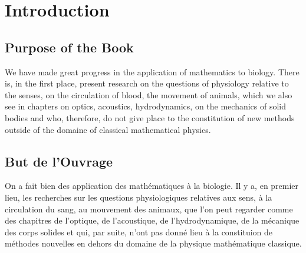 \documentclass[crop=false,class=book,oneside]{standalone}
\begin{document}
    \chapter{Introduction}
    \begin{paracol}{2}
    \section{Purpose of the Book}
    We have made great progress in the application of mathematics to biology. There is, in the first place, present research on the questions of physiology relative to the senses, on the circulation of blood, the movement of animals, which we also see in chapters on optics, acoustics, hydrodynamics, on the mechanics of solid bodies and who, therefore, do not give place to the constitution of new methods outside of the domaine of classical mathematical physics.
    \switchcolumn
    \section*{But de l'Ouvrage}
    \begin{sloppypar}
    On a fait bien des application des math\'{e}matiques \`{a} la biologie. Il y a, en premier lieu, les recherches sur les questions physiologiques relatives aux sens, \`{a} la circulation du sang, au mouvement des animaux, que l'on peut regarder comme des chapitres de l'optique, de l'acoustique, de l'hydrodynamique, de la m\'{e}canique des corps solides et qui, par suite, n'ont pas donn\'{e} lieu \`{a} la constituion de m\'{e}thodes nouvelles en dehors du domaine de la physique math\'{e}matique classique.
    \end{sloppypar}
    \end{paracol}
\end{document}
